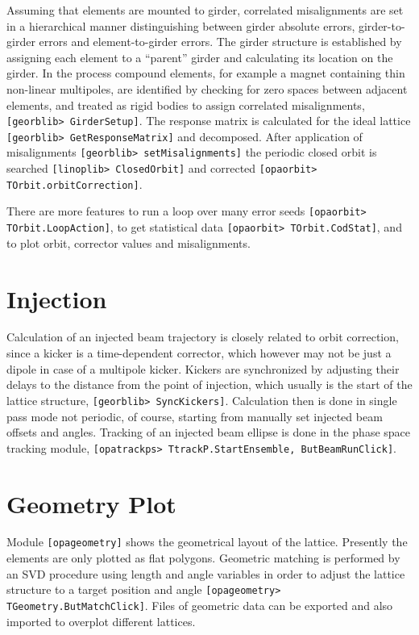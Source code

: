 \documentclass[12pt]{article}
\newcommand\code[1]{{\tt [#1]}}
\begin{document}
Assuming that elements are mounted to girder, correlated misalignments are set in a hierarchical manner distinguishing between girder absolute errors, girder-to-girder errors and element-to-girder errors. The girder structure is established by assigning each element to a ``parent'' girder and calculating its location on the girder. In the process compound elements, for example a magnet containing thin non-linear multipoles, are identified by checking for zero spaces between adjacent elements, and treated as rigid bodies to assign correlated misalignments, \code{georblib> GirderSetup}.
The response matrix is calculated for the ideal lattice \code{georblib> GetResponseMatrix} and decomposed.
After application of misalignments \code{georblib> setMisalignments} the periodic closed orbit is searched \code{linoplib> ClosedOrbit} and corrected \code{opaorbit> TOrbit.orbitCorrection}.

There are more features to run a loop over many error seeds \code{opaorbit> TOrbit.LoopAction}, to get statistical data \code{opaorbit> TOrbit.CodStat}, and to plot orbit, corrector values and misalignments.

\section{Injection}

Calculation of an injected beam trajectory is closely related to orbit correction, since a kicker is a time-dependent corrector, which however may not be just a dipole in case of a multipole kicker.
Kickers are synchronized by adjusting their delays to the distance from the point of injection, which usually is the start of the lattice structure, \code{georblib> SyncKickers}. Calculation then is done in single pass mode not periodic, of course, starting from manually set injected beam offsets and angles.
Tracking of an injected beam ellipse is done in the phase space tracking module, \code{opatrackps> TtrackP.StartEnsemble, ButBeamRunClick}.

\section{Geometry Plot}
Module \code{opageometry} shows the geometrical layout of the lattice. Presently the elements are only plotted as flat polygons. Geometric matching is performed by an SVD procedure using length and angle variables in order to adjust the lattice structure to a target position and angle \code{opageometry> TGeometry.ButMatchClick}. Files of geometric data can be exported and also imported to overplot different lattices.
\end{document}
